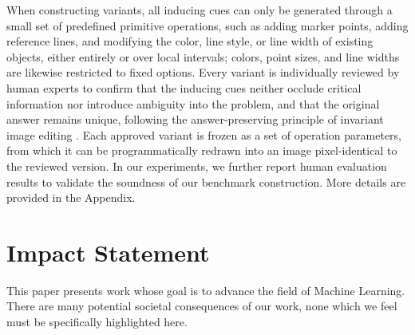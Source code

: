 \documentclass{article}
\theoremstyle{plain}
\theoremstyle{definition}
\theoremstyle{remark}
\begin{document}
When constructing variants, all inducing cues can only be generated through a small set of predefined primitive operations, such as adding marker points, adding reference lines, and modifying the color, line style, or line width of existing objects, either entirely or over local intervals; colors, point sizes, and line widths are likewise restricted to fixed options. Every variant is individually reviewed by human experts to confirm that the inducing cues neither occlude critical information nor introduce ambiguity into the problem, and that the original answer remains unique, following the answer-preserving principle of invariant image editing \cite{agarwal2020causalvqa}. Each approved variant is frozen as a set of operation parameters, from which it can be programmatically redrawn into an image pixel-identical to the reviewed version. In our experiments, we further report human evaluation results to validate the soundness of our benchmark construction. More details are provided in the Appendix.

\section*{Impact Statement}

This paper presents work whose goal is to advance the field of Machine Learning. There are many potential societal consequences of our work, none which we feel must be specifically highlighted here.



\end{document}
